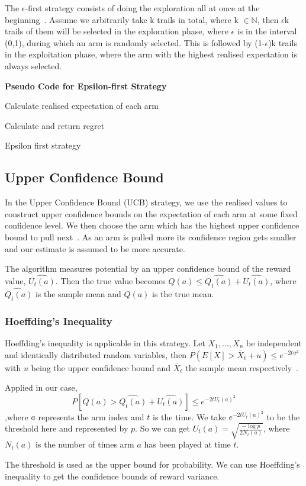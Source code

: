 The $\epsilon$-first strategy consists of doing the exploration all at once at the beginning~\citep{vermorel}.
Assume we arbitrarily take k trails in total, where k $\in \mathbb{N}$, then $\epsilon$k trails of them will be selected in the exploration phase, where $\epsilon$ is in the interval (0,1), during which an arm is randomly selected.
This is followed by (1-$\epsilon$)k trails in the exploitation phase, where the arm with the highest realised expectation is always selected.
\par
\textbf{Pseudo Code for Epsilon-first Strategy}
\newline
\begin{algorithm}[H]
        Calculate realised expectation of each arm\;

    Calculate and return regret
    \caption{Epsilon first strategy}\label{alg:epsilon_algorithm}
\end{algorithm}

\subsection{Upper Confidence Bound}\label{subsec:upper-confidence-bound}
In the Upper Confidence Bound (UCB) strategy, we use the realised values to construct upper confidence bounds on the expectation of each arm at some fixed confidence level.
We then choose the arm which has the highest upper confidence bound to pull next~\citep{SVGarbar2012}.
As an arm is pulled more its confidence region gets smaller and our estimate is assumed to be more accurate.
\par
The algorithm measures potential by an upper confidence bound of the reward value, $\widehat{U_t (a)}$.
Then the true value becomes $ Q(a)  \leq \widehat{Q_t (a)}+\widehat{U_t (a)} $, where  $ \widehat{Q_t (a)}$ is the sample mean and $ Q(a)$ is the true mean.

\subsubsection{Hoeffding’s Inequality}
Hoeffding's inequality is applicable in this strategy.
Let $X_1, \dots, X_n$ be independent and identically distributed random variables, then $ P(E[X] > \overline  X_t + u) \leq e^{-2t u^2}$ with $u$ being the upper confidence bound and $ \overline X_t $ the sample mean respectively~\citep{Hoeffding1963}.
\par
Applied in our case,
\[P[Q(a) >\widehat{Q_t (a)}+\widehat{U_t (a)}] \leq e^{-2t U_t(a)^2}\]
,where $a$ represents the arm index and $t$ is the time.
We take $e^{-2t U_t(a)^2} $ to be the threshold here and represented by $p$.
So we can get $U_t(a) = \sqrt{\frac{-\log p}{2N_t (a)}}$, where $N_t (a)$ is the number of times arm $a$ has been played at time $t$.
\par
The threshold is used as the upper bound for probability.
We can use Hoeffding's inequality to get the confidence bounds of reward variance.

